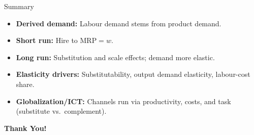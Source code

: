 \documentclass[aspectratio=169]{beamer}
\begin{document}
\begin{frame}{Summary}
\transfade
\begin{itemize}
  \item \textbf{Derived demand:} Labour demand stems from product demand.
  \item \textbf{Short run:} Hire to \( \text{MRP}=w \).
  \item \textbf{Long run:} Substitution and scale effects; demand more elastic.
  \item \textbf{Elasticity drivers:} Substitutability, output demand elasticity, labour-cost share.
  \item \textbf{Globalization/ICT:} Channels run via productivity, costs, and task (substitute vs.\ complement).
\end{itemize}
\end{frame}

\begin{frame}
\centering
\Huge{\textbf{Thank You!}} \\

\end{frame}
\end{document}
